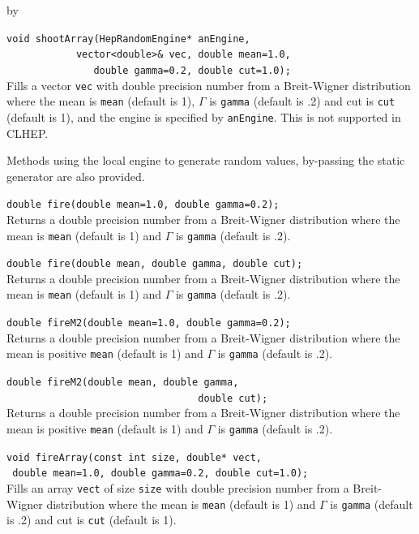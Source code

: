 \documentclass[twoside]{article}
\newcommand{\comp}[1]{\texttt{#1}}%
\newcommand{\entrylabel}[1]{\mbox{\textbf{{#1}}}\hfil}%
\newenvironment{entry}
{\begin{list}{}%
    {\renewcommand{\makelabel}{\entrylabel}%
     \setlength{\labelwidth}{90pt}%
     \setlength{\leftmargin}{\labelwidth}
     \advance\leftmargin by \labelsep%
      }%
    }%
  {\end{list}}
\newcommand{\Entrylabel}[1]%
{\raisebox{0pt}[1ex][0pt]{\makebox[\labelwidth][l]%
    {\parbox[t]{\labelwidth}{\hspace{0pt}\textbf{{#1}}}}}}
\newenvironment{Entry}%
{\renewcommand{\entrylabel}{\Entrylabel}\begin{entry}}%
  {\end{entry}}
\begin{document}
\begin{description}
\begin{Entry}
    \verb+void shootArray(HepRandomEngine* anEngine,+\\
    \verb+            vector<double>& vec, double mean=1.0,+\\
    \verb+               double gamma=0.2, double cut=1.0);+\\
    Fills a vector \comp{vec} with double
    precision number from a Breit-Wigner
    distribution where the mean is \comp{mean} (default is 1),
    $\Gamma$ is \comp{gamma} (default is .2) and cut is
    \comp{cut} (default is 1), and the engine is specified
    by \comp{anEngine}.  This is not supported in CLHEP.
    
    Methods using the local engine to generate random values, by-passing
    the static generator are also provided.
    
    \verb+double fire(double mean=1.0, double gamma=0.2);+\\
    Returns a double precision number from a Breit-Wigner
    distribution where the mean is \comp{mean} (default is 1)
    and $\Gamma$ is \comp{gamma} (default is .2).
    
    \verb+double fire(double mean, double gamma, double cut);+\\
    Returns a double precision number from a Breit-Wigner
    distribution where the mean is \comp{mean} (default is 1)
    and $\Gamma$ is \comp{gamma} (default is .2).
    
    \verb+double fireM2(double mean=1.0, double gamma=0.2);+\\
    Returns a double precision number from a Breit-Wigner
    distribution where the mean is positive \comp{mean} (default is 1)
    and $\Gamma$ is \comp{gamma} (default is .2).
    
    \verb+double fireM2(double mean, double gamma,+\\
    \verb+                                 double cut);+\\
    Returns a double precision number from a Breit-Wigner
    distribution where the mean is positive \comp{mean} (default is 1)
    and $\Gamma$ is \comp{gamma} (default is .2).
    
    \verb+void fireArray(const int size, double* vect,+\\
    \verb+ double mean=1.0, double gamma=0.2, double cut=1.0);+\\
     Fills an array \comp{vect} of size \comp{size} with double
    precision number from a Breit-Wigner
    distribution where the mean is \comp{mean} (default is 1)
    and $\Gamma$ is \comp{gamma} (default is .2) and cut is
    \comp{cut} (default is 1).


\end{Entry}
\end{description}
\end{document}
